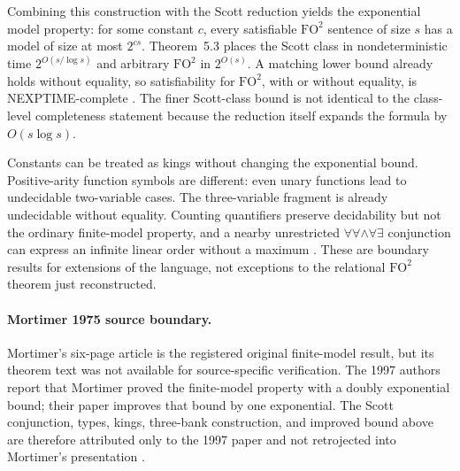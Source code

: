 Combining this construction with the Scott reduction yields the exponential
model property: for some constant \(c\), every satisfiable \(\mathrm{FO}^2\)
sentence of size \(s\) has a model of size at most \(2^{cs}\).  Theorem~5.3
places the Scott class in nondeterministic time
\(2^{O(s/\log s)}\) and arbitrary \(\mathrm{FO}^2\) in
\(2^{O(s)}\).  A matching lower bound already holds without equality, so
satisfiability for \(\mathrm{FO}^2\), with or without equality, is
NEXPTIME-complete \cite[thms.~5.1 and 5.3 and cor.~5.4]{GradelKolaitisVardi1997}.
The finer Scott-class bound is not identical to the class-level completeness
statement because the reduction itself expands the formula by
\(O(s\log s)\).

Constants can be treated as kings without changing the exponential bound.
Positive-arity function symbols are different: even unary functions lead to
undecidable two-variable cases.  The three-variable fragment is already
undecidable without equality.  Counting quantifiers preserve decidability but
not the ordinary finite-model property, and a nearby unrestricted
\(\forall\forall\land\forall\exists\) conjunction can express an infinite
linear order without a maximum \cite[pp.~53--54 and 66--67]{GradelKolaitisVardi1997}.
These are boundary results for extensions of the language, not exceptions to
the relational \(\mathrm{FO}^2\) theorem just reconstructed.

\paragraph{Mortimer 1975 source boundary.}
Mortimer's six-page article is the registered original finite-model result, but
its theorem text was not available for source-specific verification.  The 1997
authors report that Mortimer proved the finite-model property with a doubly
exponential bound; their paper improves that bound by one exponential.  The
Scott conjunction, types, kings, three-bank construction, and improved bound
above are therefore attributed only to the 1997 paper and not retrojected into
Mortimer's presentation \cite{Mortimer1975,GradelKolaitisVardi1997}.
